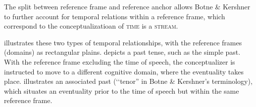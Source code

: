 The split between reference frame and reference anchor allows Botne \& Kershner to further account for temporal relations within a reference frame, which correspond to the conceptualizatioan of \textsc{time} is a \textsc{stream}. 

 illustrates these two types of temporal relationships, with the reference frames (domains) as rectangular plains.  depicts a past tense, such as the  simple past. With the reference frame excluding the time of speech, the conceptualizer is instructed to move to a different cognitive domain, where the eventuality takes place.  illustrates an associated past (\lq\lq tenor'' in Botne \& Kershner's terminology), which situates an eventuality prior to the time of speech but within the same reference frame.

